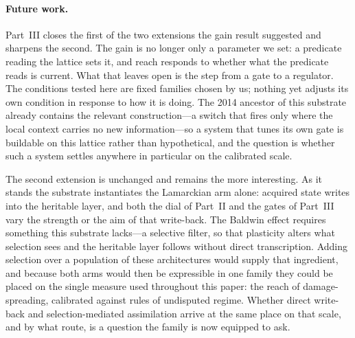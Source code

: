 \documentclass[man,12pt,floatsintext,donotrepeattitle]{apa7}
\begin{document}
\paragraph{Future work.} Part~III closes the first of the two extensions the gain
result suggested and sharpens the second. The gain is no longer only a parameter we
set: a predicate reading the lattice sets it, and reach responds to whether what the
predicate reads is current. What that leaves open is the step from a gate to a
regulator. The conditions tested here are fixed families chosen by us; nothing yet
adjusts its own condition in response to how it is doing. The 2014 ancestor of this
substrate already contains the relevant construction---a switch that fires only where
the local context carries no new information---so a system that tunes its own gate is
buildable on this lattice rather than hypothetical, and the question is whether such a
system settles anywhere in particular on the calibrated scale.

The second extension is unchanged and remains the more interesting. As it stands the
substrate instantiates the Lamarckian arm alone: acquired state writes into the
heritable layer, and both the dial of Part~II and the gates of Part~III vary the
strength or the aim of that write-back. The Baldwin effect requires something this
substrate lacks---a selective filter, so that plasticity alters what selection sees and
the heritable layer follows without direct transcription. Adding selection over a
population of these architectures would supply that ingredient, and because both arms
would then be expressible in one family they could be placed on the single measure used
throughout this paper: the reach of damage-spreading, calibrated against rules of
undisputed regime. Whether direct write-back and selection-mediated assimilation arrive
at the same place on that scale, and by what route, is a question the family is now
equipped to ask.
\end{document}
